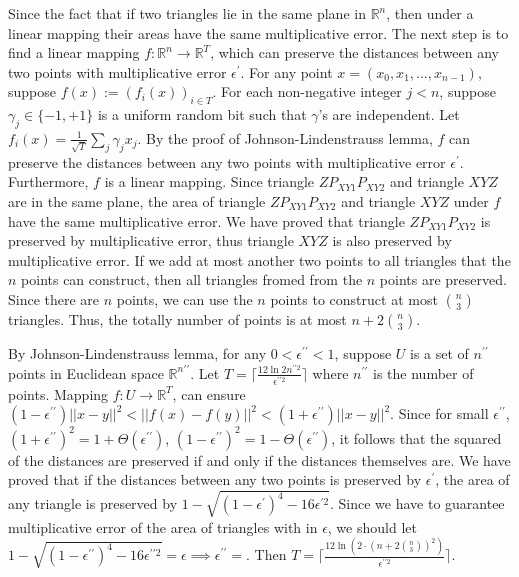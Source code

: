 Since the fact that if two triangles lie in the same plane in $\mathbb{R}^n$, 
then under a linear mapping their areas have the same multiplicative error.
The next step is to find a linear mapping $f:\mathbb{R}^n\rightarrow\mathbb{R}^T$, which can preserve the distances between any two points with multiplicative error $\epsilon^{\prime}$.
For any point $x=(x_0,x_1,...,x_{n-1})$, suppose $f(x):=(f_i(x))_{i\in T}$. For each non-negative integer $j< n$, suppose $\gamma_j \in \{-1, +1\}$ is a uniform random
bit such that $\gamma$'s are independent. Let $f_i(x)=\frac{1}{\sqrt{T}}\sum_{j}\gamma_jx_j$.
By the proof of Johnson-Lindenstrauss lemma, $f$ can preserve the distances between any two points with multiplicative error $\epsilon^{\prime}$.
Furthermore, $f$ is a linear mapping. Since triangle $ZP_{XY1}P_{XY2}$ and triangle $XYZ$ are in the same plane,
the area of triangle $ZP_{XY1}P_{XY2}$ and triangle $XYZ$ under $f$ have the same multiplicative error.
We have proved that triangle $ZP_{XY1}P_{XY2}$ is preserved by multiplicative error, thus triangle $XYZ$ is also preserved by multiplicative error.
If we add at most another two points to all triangles that the $n$ points can construct, 
then all triangles fromed from the $n$ points are preserved. 
Since there are $n$ points, we can use the $n$ points to construct at most $\binom{n}{3}$ triangles.
Thus, the totally number of points is at most $n+2\binom{n}{3}$.

By Johnson-Lindenstrauss lemma, for any $0<\epsilon^{\prime\prime}<1$, suppose $U$ is a set of $n^{\prime\prime}$ points in Euclidean space $\mathbb{R}^{n\prime \prime}$.
Let $T=\lceil \frac{12\ln2n^{\prime\prime 2}}{\epsilon^{\prime\prime 2}} \rceil$ where $n^{\prime\prime}$ is the number of points. 
Mapping $f: U\rightarrow \mathbb{R}^T$,
can ensure $(1-\epsilon^{\prime\prime})||x-y||^2<||f(x)-f(y)||^2<(1+\epsilon^{\prime\prime})||x-y||^2$.
Since for small $\epsilon^{\prime\prime}$, $(1+\epsilon^{\prime\prime})^2=1+\Theta(\epsilon^{\prime\prime})$, $(1-\epsilon^{\prime\prime})^2=1-\Theta(\epsilon^{\prime\prime})$,
it follows that the squared of the distances are preserved if and only if the distances themselves are.
We have proved that 
if the distances between any two points is preserved by $\epsilon^{\prime}$, the area of any triangle is preserved by $1-\sqrt{(1-\epsilon^{\prime})^4-16\epsilon^{\prime 2}}$.
Since we have to guarantee  multiplicative error of the area of triangles with in $\epsilon$, 
we should let  $1-\sqrt{(1-\epsilon^{\prime\prime})^4-16\epsilon^{\prime\prime 2}}=\epsilon \implies \epsilon^{\prime\prime}=$.
Then $T=\lceil \frac{12\ln(2\cdot (n+2\binom{n}{3})^2)  }{\epsilon^{\prime\prime 2}} \rceil$.
